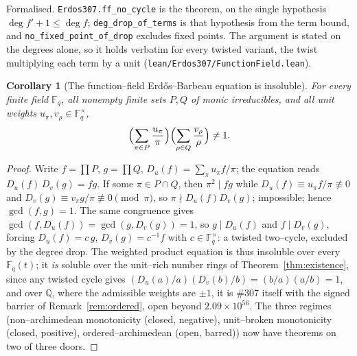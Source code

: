 \documentclass[11pt]{article}
\newtheorem{corollary}[theorem]{Corollary}
\theoremstyle{definition}
\begin{document}
\noindent\textup{Formalised.} \texttt{Erdos307.ff\_no\_cycle} is the theorem, on the single
hypothesis $\deg f'+1\le\deg f$; \texttt{deg\_drop\_of\_terms} is that hypothesis from the term
bound, and \texttt{no\_fixed\_point\_of\_drop} excludes fixed points. The argument is stated on the
degrees alone, so it holds verbatim for every twisted variant, the twist multiplying each term by a
unit \textup{(\texttt{lean/Erdos307/FunctionField.lean})}.

\begin{corollary}[The function--field Erd\H{o}s--Barbeau equation is insoluble]\label{cor:ff307}
For every finite field $\mathbb{F}_q$, all nonempty finite sets $P,Q$ of monic irreducibles, and all
unit weights $u_\pi,v_\rho\in\mathbb{F}_q^\times$,
\[
\Bigl(\sum_{\pi\in P}\frac{u_\pi}{\pi}\Bigr)\Bigl(\sum_{\rho\in Q}\frac{v_\rho}{\rho}\Bigr)\ne1.
\]
\end{corollary}
\begin{proof}
Write $f=\prod P$, $g=\prod Q$, $D_u(f)=\sum_\pi u_\pi f/\pi$; the equation reads $D_u(f)\,D_v(g)=fg$.
If some $\pi\in P\cap Q$, then $\pi^2\mid fg$ while $D_u(f)\equiv u_\pi f/\pi\not\equiv0$ and
$D_v(g)\equiv v_\pi g/\pi\not\equiv0\pmod\pi$, so $\pi\nmid D_u(f)D_v(g)$; impossible; hence
$\gcd(f,g)=1$. The same congruence gives $\gcd(f,D_u(f))=\gcd(g,D_v(g))=1$, so $g\mid D_u(f)$ and
$f\mid D_v(g)$, forcing $D_u(f)=c\,g$, $D_v(g)=c^{-1}f$ with $c\in\mathbb{F}_q^\times$: a twisted
two--cycle, excluded by the degree drop. The weighted product equation is thus insoluble over every
$\mathbb{F}_q(t)$; it \emph{is} soluble over the unit--rich number rings of
Theorem~\ref{thm:existence}, since any twisted cycle gives $(D_u(a)/a)(D_v(b)/b)=(b/a)(a/b)=1$, and over
$\mathbb{Q}$, where the admissible weights are $\pm1$, it is \#307 itself with the signed barrier of
Remark~\ref{rem:ordered}, open beyond $2.09\times10^{56}$. The three regimes (non--archimedean
monotonicity (closed, negative), unit--broken monotonicity (closed, positive), ordered--archimedean
(open, barred)) now have theorems on two of three doors.
\end{proof}
\end{document}
